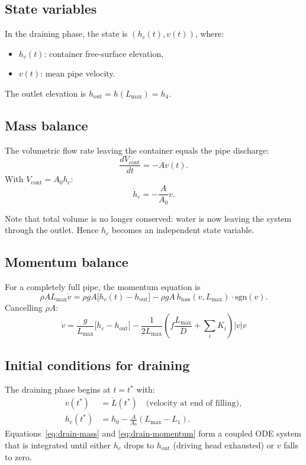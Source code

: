 \documentclass[11pt]{article}
\theoremstyle{definition}
\begin{document}
\subsection{State variables}

In the draining phase, the state is $(h_c(t), v(t))$, where:
\begin{itemize}[nosep]
  \item $h_c(t)$: container free-surface elevation,
  \item $v(t)$: mean pipe velocity.
\end{itemize}
The outlet elevation is $h_{\text{out}} = h(L_{\max}) = h_4$.

\subsection{Mass balance}

The volumetric flow rate leaving the container equals the pipe discharge:
\[
  \frac{dV_{\text{cont}}}{dt} = -A v(t).
\]
With $V_{\text{cont}} = A_0 h_c$:
\begin{equation}
  \boxed{\dot{h}_c = -\frac{A}{A_0} v.}
  \label{eq:drain-mass}
\end{equation}

Note that total volume is no longer conserved: water is now leaving the system through 
the outlet. Hence $h_c$ becomes an independent state variable.

\subsection{Momentum balance}

For a completely full pipe, the momentum equation is
\[
  \rho A L_{\max} \dot{v} = \rho g A\bigl[h_c(t) - h_{\text{out}}\bigr]
                           - \rho g A\, h_{\text{loss}}(v, L_{\max}) \cdot \text{sgn}(v).
\]
Cancelling $\rho A$:
\begin{equation}
  \boxed{\dot{v} = \frac{g}{L_{\max}}\bigl[h_c - h_{\text{out}}\bigr]
         - \frac{1}{2L_{\max}}\left(f \frac{L_{\max}}{D} + \sum_i K_i\right) |v| v}
  \label{eq:drain-momentum}
\end{equation}

\subsection{Initial conditions for draining}

The draining phase begins at $t = t^*$ with:
\begin{align}
  v(t^*) &= \dot{L}(t^*) \quad \text{(velocity at end of filling)}, \label{eq:drain-IC-v} \\
  h_c(t^*) &= h_0 - \frac{A}{A_0}(L_{\max} - L_1). \label{eq:drain-IC-hc}
\end{align}
Equations~\eqref{eq:drain-mass} and \eqref{eq:drain-momentum} form a coupled ODE system 
that is integrated until either $h_c$ drops to $h_{\text{out}}$ (driving head exhausted) 
or $v$ falls to zero.
\end{document}
